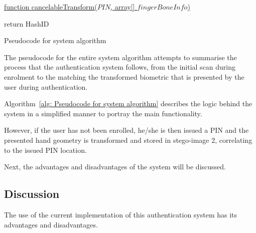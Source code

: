 
\begin{algorithm}
     
     \underline{function cancelableTransform($PIN$, array[] $fingerBoneInfo$)}\;
     
        
      return HashID\;
     \caption{Pseudocode for system algorithm}
     \label{alg: Pseudocode for system algorithm}
     
\end{algorithm}



The pseudocode for the entire system algorithm attempts to summarise the process that the authentication system follows, from the initial scan during enrolment to the matching the transformed biometric that is presented by the user during authentication.

Algorithm~\ref{alg: Pseudocode for system algorithm} describes the logic behind the system in a simplified manner to portray the main functionality. 



However, if the user has not been enrolled, he/she is then issued a PIN and the presented hand geometry is transformed and stored in stego-image 2, correlating to the issued PIN location.

Next, the advantages and disadvantages of the system will be discussed.

\subsection{Discussion}

The use of the current implementation of this authentication system has its advantages and disadvantages.


